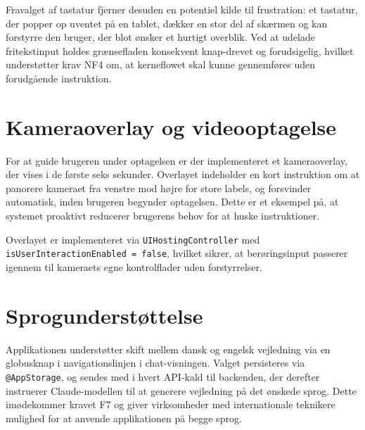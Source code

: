 Fravalget af tastatur fjerner desuden en potentiel kilde til frustration: et tastatur, der popper op uventet på en tablet, dækker en stor del af skærmen og kan forstyrre den bruger, der blot ønsker et hurtigt overblik. Ved at udelade fritekstinput holdes grænsefladen konsekvent knap-drevet og forudsigelig, hvilket understøtter krav NF4 om, at kerneflowet skal kunne gennemføres uden forudgående instruktion.

\section{Kameraoverlay og videooptagelse}
\label{sec:kameraoverlay}

For at guide brugeren under optagelsen er der implementeret et kameraoverlay, der vises i de første seks sekunder. Overlayet indeholder en kort instruktion om at panorere kameraet fra venstre mod højre for store labels, og forsvinder automatisk, inden brugeren begynder optagelsen. Dette er et eksempel på, at systemet proaktivt reducerer brugerens behov for at huske instruktioner.

Overlayet er implementeret via \texttt{UIHostingController} med \texttt{isUserInteractionEnabled = false}, hvilket sikrer, at berøringsinput passerer igennem til kameraets egne kontrolflader uden forstyrrelser.

\section{Sprogunderstøttelse}
\label{sec:sprog}

Applikationen understøtter skift mellem dansk og engelsk vejledning via en globusknap i navigationslinjen i chat-visningen. Valget persisteres via \texttt{@AppStorage}, og sendes med i hvert API-kald til backenden, der derefter instruerer Claude-modellen til at generere vejledning på det ønskede sprog. Dette imødekommer kravet F7 og giver virksomheder med internationale teknikere mulighed for at anvende applikationen på begge sprog.
